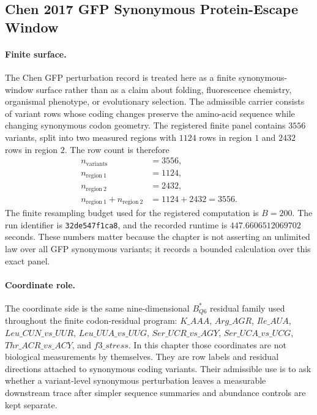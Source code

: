\subsection{Chen 2017 GFP Synonymous Protein-Escape Window}\label{sec:biorality-chen-gfp-synonymous-protein-escape}

\paragraph{Finite surface.}
The Chen GFP perturbation record is treated here as a finite synonymous-window surface rather than as a claim about folding, fluorescence chemistry, organismal phenotype, or evolutionary selection.  The admissible carrier consists of variant rows whose coding changes preserve the amino-acid sequence while changing synonymous codon geometry.  The registered finite panel contains $3556$ variants, split into two measured regions with $1124$ rows in region $1$ and $2432$ rows in region $2$.  The row count is therefore
$$
\begin{aligned}
  n_{\mathrm{variants}} &= 3556,\\
  n_{\mathrm{region\ 1}} &= 1124,\\
  n_{\mathrm{region\ 2}} &= 2432,\\
  n_{\mathrm{region\ 1}} + n_{\mathrm{region\ 2}} &= 1124 + 2432 = 3556.
\end{aligned}
$$
The finite resampling budget used for the registered computation is $B=200$.  The run identifier is \texttt{32de547f1ca8}, and the recorded runtime is $447.6606512069702$ seconds.  These numbers matter because the chapter is not asserting an unlimited law over all GFP synonymous variants; it records a bounded calculation over this exact panel.

\paragraph{Coordinate role.}
The coordinate side is the same nine-dimensional $B^{\ast}_{Q6}$ residual family used throughout the finite codon-residual program: $K\_AAA$, $Arg\_AGR$, $Ile\_AUA$, $Leu\_CUN\_vs\_UUR$, $Leu\_UUA\_vs\_UUG$, $Ser\_UCR\_vs\_AGY$, $Ser\_UCA\_vs\_UCG$, $Thr\_ACR\_vs\_ACY$, and $f3\_stress$.  In this chapter those coordinates are not biological measurements by themselves.  They are row labels and residual directions attached to synonymous coding variants.  Their admissible use is to ask whether a variant-level synonymous perturbation leaves a measurable downstream trace after simpler sequence summaries and abundance controls are kept separate.

